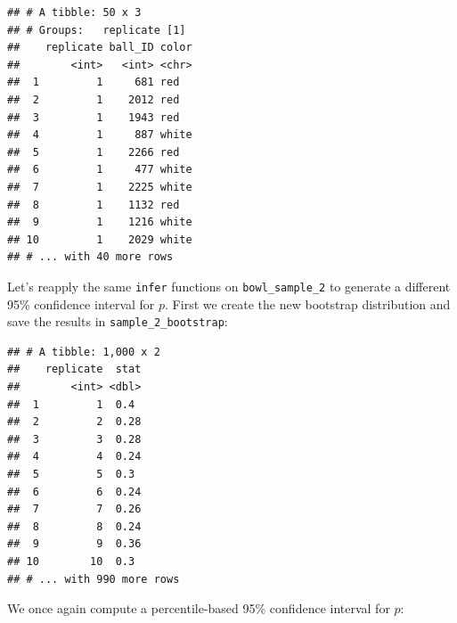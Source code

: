 \documentclass[
]{book}
\newenvironment{Shaded}{\begin{snugshade}}{\end{snugshade}}
\newcommand{\DataTypeTok}[1]{\textcolor[rgb]{0.13,0.29,0.53}{#1}}
\newcommand{\DecValTok}[1]{\textcolor[rgb]{0.00,0.00,0.81}{#1}}
\newcommand{\FloatTok}[1]{\textcolor[rgb]{0.00,0.00,0.81}{#1}}
\newcommand{\KeywordTok}[1]{\textcolor[rgb]{0.13,0.29,0.53}{\textbf{#1}}}
\newcommand{\NormalTok}[1]{#1}
\newcommand{\OperatorTok}[1]{\textcolor[rgb]{0.81,0.36,0.00}{\textbf{#1}}}
\newcommand{\StringTok}[1]{\textcolor[rgb]{0.31,0.60,0.02}{#1}}
\begin{document}
\begin{verbatim}
## # A tibble: 50 x 3
## # Groups:   replicate [1]
##    replicate ball_ID color
##        <int>   <int> <chr>
##  1         1     681 red  
##  2         1    2012 red  
##  3         1    1943 red  
##  4         1     887 white
##  5         1    2266 red  
##  6         1     477 white
##  7         1    2225 white
##  8         1    1132 red  
##  9         1    1216 white
## 10         1    2029 white
## # ... with 40 more rows
\end{verbatim}

Let's reapply the same \texttt{infer} functions on \texttt{bowl\_sample\_2} to generate a different 95\% confidence interval for \(p\). First we create the new bootstrap distribution and save the results in \texttt{sample\_2\_bootstrap}:

\begin{Shaded}
\end{Shaded}

\begin{verbatim}
## # A tibble: 1,000 x 2
##    replicate  stat
##        <int> <dbl>
##  1         1  0.4 
##  2         2  0.28
##  3         3  0.28
##  4         4  0.24
##  5         5  0.3 
##  6         6  0.24
##  7         7  0.26
##  8         8  0.24
##  9         9  0.36
## 10        10  0.3 
## # ... with 990 more rows
\end{verbatim}

We once again compute a percentile-based 95\% confidence interval for \(p\):

\begin{Shaded}
\end{Shaded}
\end{document}

